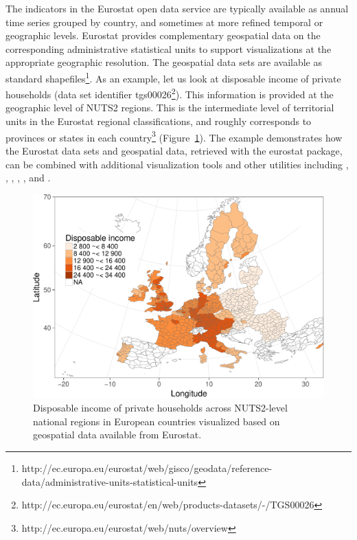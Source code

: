 The indicators in the Eurostat open data service are typically
available as annual time series grouped by country, and sometimes at
more refined temporal or geographic levels. Eurostat provides
complementary geospatial data on the corresponding administrative
statistical units to support visualizations at the appropriate
geographic resolution. The geospatial data sets are available as
standard
shapefiles\footnote{http://ec.europa.eu/eurostat/web/gisco/geodata/reference-data/administrative-units-statistical-units}. As
an example, let us look at disposable income of private households
(data set identifier
tgs00026\footnote{http://ec.europa.eu/eurostat/en/web/products-datasets/-/TGS00026}). This
information is provided at the geographic level of NUTS2 regions. This
is the intermediate level of territorial units in the Eurostat
regional classifications, and roughly corresponds to provinces or
states in each
country\footnote{http://ec.europa.eu/eurostat/web/nuts/overview}
(Figure~\ref{fig:mapexample}). The
example demonstrates how the Eurostat data sets and geospatial data,
retrieved with the eurostat package, can be combined with additional
visualization tools and other utilities including
 \citep{grid},  \citep{maptools},  \citep{rgdal},
 \citep{rgeos},  \citep{scales}, and
 \citep{stringr}.

\begin{figure}
\begin{center}
\includegraphics{2015-manu-mapexample-1}
\caption{Disposable income of private households across NUTS2-level national regions in European countries visualized based on geospatial data available from Eurostat.}
\label{fig:mapexample}
\end{center}
\end{figure}


